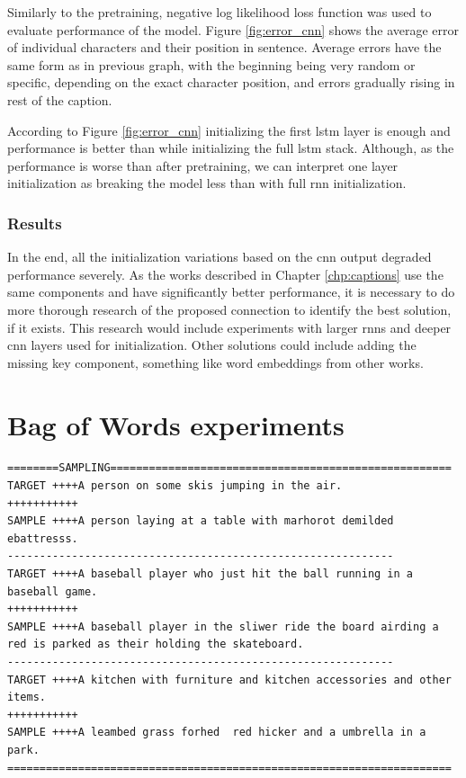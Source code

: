 Similarly to the pretraining, negative log likelihood loss function was used to evaluate performance of the model. Figure \ref{fig:error_cnn} shows the average error of individual characters and their position in sentence. Average errors have the same form as in previous graph, with the beginning being very random or specific, depending on the exact character position, and errors gradually rising in rest of the caption.

According to Figure \ref{fig:error_cnn} initializing the first \gls{lstm} layer is enough and performance is better than while initializing the full \gls{lstm} stack. Although, as the performance is worse than after pretraining, we can interpret one layer initialization as breaking the model less than with full \gls{rnn} initialization.

\subsubsection{Results}

In the end, all the initialization variations based on the \gls{cnn} output degraded performance severely. As the works described in Chapter \ref{chp:captions} use the same components and have significantly better performance, it is necessary to do more thorough research of the proposed connection to identify the best solution, if it exists. This research would include experiments with larger \gls{rnn}s and deeper \gls{cnn} layers used for initialization. Other solutions could include adding the missing key component, something like word embeddings from other works.

\section{Bag of Words experiments} \label{sec:exbow}

\vspace{7mm}
\begin{lstlisting}[breakindent=58pt]
========SAMPLING=====================================================
TARGET ++++A person on some skis jumping in the air.
+++++++++++
SAMPLE ++++A person laying at a table with marhorot demilded ebattresss.
------------------------------------------------------------
TARGET ++++A baseball player who just hit the ball running in a baseball game.
+++++++++++
SAMPLE ++++A baseball player in the sliwer ride the board airding a red is parked as their holding the skateboard.
------------------------------------------------------------
TARGET ++++A kitchen with furniture and kitchen accessories and other items.
+++++++++++
SAMPLE ++++A leambed grass forhed  red hicker and a umbrella in a park.
=====================================================================
\end{lstlisting}
\vspace{7mm}

